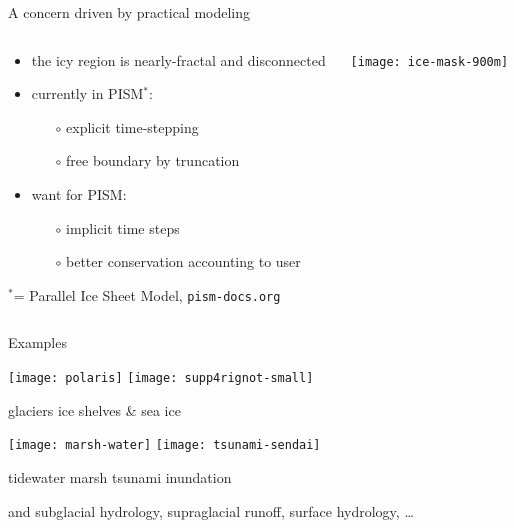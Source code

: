 \documentclass{beamer}
\begin{document}
\begin{frame}{A concern driven by practical modeling}

\begin{columns}
\begin{column}{0.5\textwidth}
\begin{itemize}
\small
\item the icy region is nearly-fractal and disconnected
\item currently in PISM$^*$:
  \begin{itemize}
  \item[$\circ$] explicit time-stepping
  \item[$\circ$] free boundary by truncation
  \end{itemize}
\item want for PISM:
  \begin{itemize}
  \item[$\circ$] implicit time steps
  \item[$\circ$] better conservation accounting to user
  \end{itemize}
\end{itemize}

\vspace{10mm}
{\scriptsize $^*$= Parallel Ice Sheet Model, \texttt{pism-docs.org}}
\end{column}
\begin{column}{0.5\textwidth}
\vspace{-5mm}

\begin{center}
\texttt{[image: ice-mask-900m]}
\end{center}
\end{column}
\end{columns}
\end{frame}


\begin{frame}{Examples}

\texttt{[image: polaris]}
\hfill
\texttt{[image: supp4rignot-small]}

\small glaciers \hfill ice shelves \& sea ice

\medskip
\texttt{[image: marsh-water]}
\hfill
\texttt{[image: tsunami-sendai]}

\small tidewater marsh \hfill tsunami inundation

\scriptsize and subglacial hydrology, supraglacial runoff, surface hydrology, \dots
\end{frame}
\end{document}
